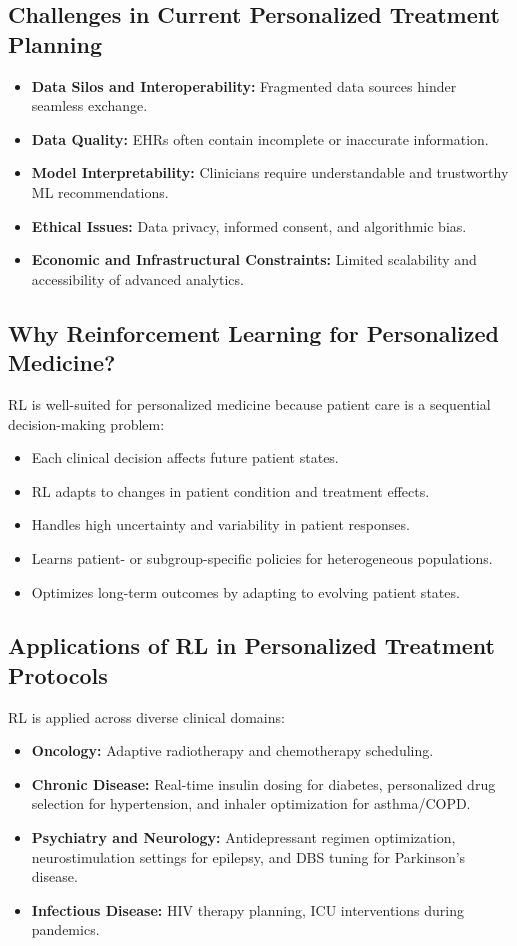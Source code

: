 \subsection*{Challenges in Current Personalized Treatment Planning}
\begin{itemize}
    \item \textbf{Data Silos and Interoperability:} Fragmented data sources hinder seamless exchange.
    \item \textbf{Data Quality:} EHRs often contain incomplete or inaccurate information.
    \item \textbf{Model Interpretability:} Clinicians require understandable and trustworthy ML recommendations.
    \item \textbf{Ethical Issues:} Data privacy, informed consent, and algorithmic bias.
    \item \textbf{Economic and Infrastructural Constraints:} Limited scalability and accessibility of advanced analytics.
\end{itemize}

\subsection*{Why Reinforcement Learning for Personalized Medicine?}
RL is well-suited for personalized medicine because patient care is a sequential decision-making problem:
\begin{itemize}
    \item Each clinical decision affects future patient states.
    \item RL adapts to changes in patient condition and treatment effects.
    \item Handles high uncertainty and variability in patient responses.
    \item Learns patient- or subgroup-specific policies for heterogeneous populations.
    \item Optimizes long-term outcomes by adapting to evolving patient states.
\end{itemize}

\subsection*{Applications of RL in Personalized Treatment Protocols}
RL is applied across diverse clinical domains:
\begin{itemize}
    \item \textbf{Oncology:} Adaptive radiotherapy and chemotherapy scheduling.
    \item \textbf{Chronic Disease:} Real-time insulin dosing for diabetes, personalized drug selection for hypertension, and inhaler optimization for asthma/COPD.
    \item \textbf{Psychiatry and Neurology:} Antidepressant regimen optimization, neurostimulation settings for epilepsy, and DBS tuning for Parkinson's disease.
    \item \textbf{Infectious Disease:} HIV therapy planning, ICU interventions during pandemics.
\end{itemize}

